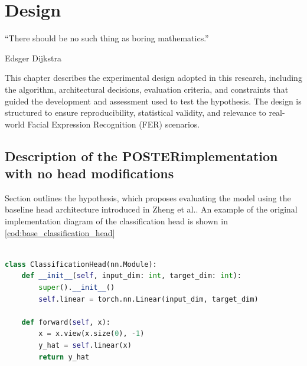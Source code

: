 \chapter{Design}
\epigraph{``There should be no such thing as boring mathematics.''}{\vspace{10pt}Edsger Dijkstra}
\label{chapter:design}
\newpage



This chapter describes the experimental design adopted in this research, including the algorithm,  architectural decisions, evaluation criteria, and constraints that guided the development and assessment used to test the hypothesis. The design is structured to ensure reproducibility, statistical validity, and relevance to real-world Facial Expression Recognition (\gls{FER}) scenarios.



%

\section{Description of the \gls{POSTER}implementation with no head modifications}

Section  outlines the hypothesis, which proposes evaluating the model using the baseline head architecture introduced in Zheng et al.\cite{zheng_poster_2022}. An example of the original implementation diagram of the classification head is shown in \ref{cod:base_classification_head}

\begin{lstlisting}[language=Python, caption={Base classification head}, label={cod:base_classification_head}]

class ClassificationHead(nn.Module):
    def __init__(self, input_dim: int, target_dim: int):
        super().__init__()
        self.linear = torch.nn.Linear(input_dim, target_dim)

    def forward(self, x):
        x = x.view(x.size(0), -1)
        y_hat = self.linear(x)
        return y_hat

\end{lstlisting}


